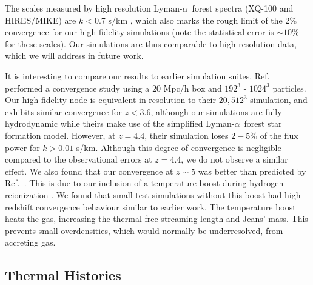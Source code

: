 \documentclass[a4paper,11pt]{article}
\newcommand{\spb}[1]{{\textcolor{magenta}{[{\bf SPB}: #1]}}}
\newcommand{\Lya}{Lyman-$\alpha$}
\begin{document}
The scales measured by high resolution \Lya~forest spectra (XQ-100 and HIRES/MIKE) are $ k < 0.7$ s/km \cite{Irsic:2017}, which also marks the rough limit of the $2\%$ convergence for our high fidelity simulations (note the statistical error is $\sim 10\%$ for these scales). Our simulations are thus comparable to high resolution data, which we will address in future work.

It is interesting to compare our results to earlier simulation suites. Ref.~\cite{Borde:2014} performed a convergence study using a $20$ Mpc/h box and $192^3$ - $1024^3$ particles. Our high fidelity node is equivalent in resolution to their $20, 512^3$ simulation, and exhibits similar convergence for $z < 3.6$, although our simulations are fully hydrodynamic while theirs make use of the simplified \Lya~forest star formation model. However, at $z=4.4$, their simulation loses $2-5\%$ of the flux power for $k > 0.01$ s/km. Although this degree of convergence is negligible compared to the observational errors at $z=4.4$, we do not observe a similar effect.
We also found that our convergence at $z \sim 5$ was better than predicted by Ref.~\cite{2009MNRAS.398L..26B, Bolton:2017}. This is due to our inclusion of a temperature boost during hydrogen reionization \cite{DAloisio:2019}. We found that small test simulations without this boost had high redshift convergence behaviour similar to earlier work. The temperature boost heats the gas, increasing the thermal free-streaming length and Jeans' mass. This prevents small overdensities, which would normally be underresolved, from accreting gas.



\subsection{Thermal Histories}
\end{document}
